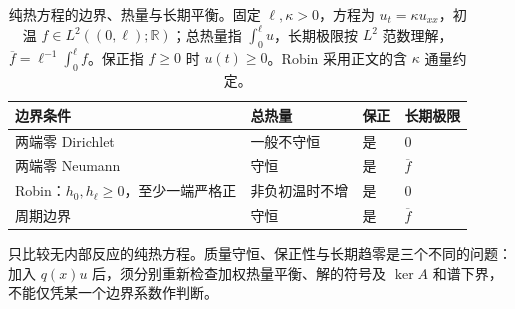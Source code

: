 \begin{table}[htbp]
\centering
\small
\setlength{\tabcolsep}{4pt}
\caption[纯热方程的边界、热量与长期平衡]{纯热方程的边界、热量与长期平衡。固定 \(\ell,\kappa>0\)，方程为 \(u_t=\kappa u_{xx}\)，初温 \(f\in L^2((0,\ell);\mathbb R)\)；总热量指 \(\int_0^\ell u\)，长期极限按 \(L^2\) 范数理解，\(\overline f=\ell^{-1}\int_0^\ell f\)。保正指 \(f\geq0\) 时 \(u(t)\geq0\)。Robin 采用正文的含 \(\kappa\) 通量约定。}
\label{b2:tab:12-boundary-heat-equilibrium}
\begin{tabularx}{\linewidth}{@{}>{\raggedright\arraybackslash}p{3.5cm}>{\raggedright\arraybackslash}X>{\raggedright\arraybackslash}p{1.1cm}>{\raggedright\arraybackslash}p{1.8cm}@{}}
\toprule
边界条件 & 总热量 & 保正 & 长期极限 \\
\midrule
两端零 Dirichlet & 一般不守恒 & 是 & \(0\) \\
两端零 Neumann & 守恒 & 是 & \(\overline f\) \\
Robin：\(h_0,h_\ell\geq0\)，至少一端严格正 & 非负初温时不增 & 是 & \(0\) \\
周期边界 & 守恒 & 是 & \(\overline f\) \\
\bottomrule
\end{tabularx}
\end{table}

只比较无内部反应的纯热方程。质量守恒、保正性与长期趋零是三个不同的问题：加入 \(q(x)u\) 后，须分别重新检查加权热量平衡、解的符号及 \(\ker A\) 和谱下界，不能仅凭某一个边界系数作判断。

